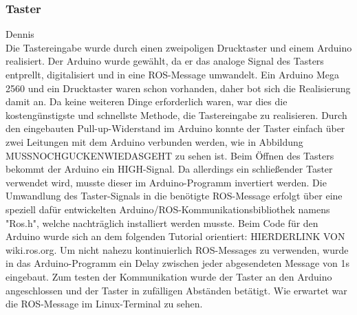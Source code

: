 \documentclass[a4paper,12pt,headsepline]{scrartcl}
\begin{document}
	\subsubsection{Taster}
		Dennis\\
	Die Tastereingabe wurde durch einen zweipoligen Drucktaster und einem Arduino realisiert. Der Arduino wurde gewählt, da er das analoge Signal des Tasters entprellt, digitalisiert und in eine ROS-Message umwandelt. Ein Arduino Mega 2560 und ein Drucktaster waren schon vorhanden, daher bot sich die Realisierung damit an. Da keine weiteren Dinge erforderlich waren, war dies die kostengünstigste und schnellste Methode, die Tastereingabe zu realisieren. Durch den eingebauten Pull-up-Widerstand im Arduino konnte der Taster einfach über zwei Leitungen mit dem Arduino verbunden werden, wie in Abbildung {MUSSNOCHGUCKENWIEDASGEHT} zu sehen ist. Beim Öffnen des Tasters bekommt der Arduino ein HIGH-Signal. Da allerdings ein schließender Taster verwendet wird, musste dieser im Arduino-Programm invertiert werden. Die Umwandlung des Taster-Signals in die benötigte ROS-Message erfolgt über eine speziell dafür entwickelten Arduino/ROS-Kommunikationsbibliothek namens "Ros.h", welche nachträglich installiert werden musste. Beim Code für den Arduino wurde sich an dem folgenden Tutorial orientiert: {HIERDERLINK VON wiki.ros.org}. Um nicht nahezu kontinuierlich ROS-Messages zu verwenden, wurde in das Arduino-Programm ein Delay zwischen jeder abgesendeten Message von 1s eingebaut. Zum testen der Kommunikation wurde der Taster an den Arduino angeschlossen und der Taster in zufälligen Abständen betätigt. Wie erwartet war die ROS-Message im Linux-Terminal zu sehen.\\
\end{document}
